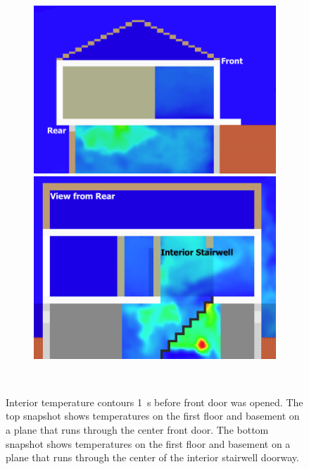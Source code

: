 \documentclass[12pt,oneside]{book}
\begin{document}
\begin{figure}[!ht]
\begin{subfigure}{0.65\textwidth}
\includegraphics[trim = 0in 0in 0in 0in, clip=true, width=\textwidth]{../Figures/side_view_99s} \\
\vskip4pt
\includegraphics[trim = 0in 0in 0in 0in, clip=true, width=\textwidth]{../Figures/stair_view_99s} 
\end{subfigure}
\begin{subfigure}{0.35\textwidth}

 \\
\end{subfigure}
\caption[Interior temperature contours 1~s before front door was opened]
{Interior temperature contours 1~s before front door was opened. The top snapshot shows temperatures on the first floor and basement on a plane that runs through the center front door. The bottom snapshot shows temperatures on the first floor and basement on a plane that runs through the center of the interior stairwell doorway.}
\label{fig:int_temp_99s}
\end{figure}
\end{document}
